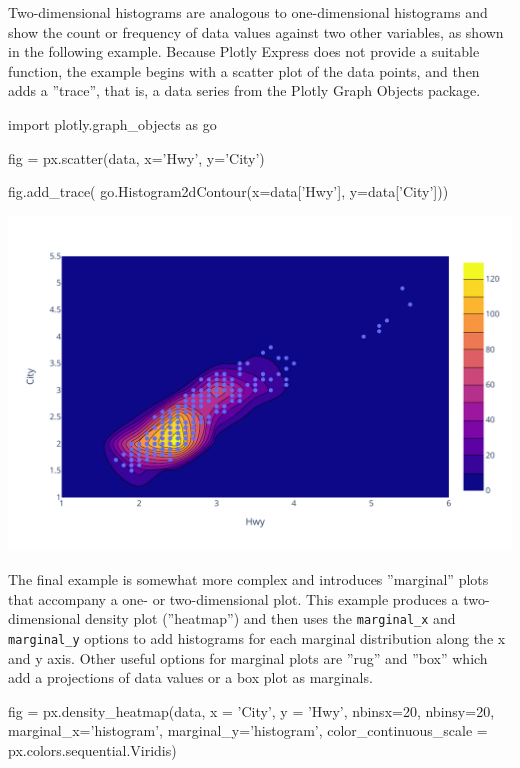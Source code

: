 Two-dimensional histograms  are analogous to one-dimensional histograms and show the count or frequency of data values against two other variables, as shown in the following example. Because Plotly Express does not provide a suitable function, the example begins with a scatter plot of the data points, and then adds a ''trace'', that is, a data series from the Plotly Graph Objects package. 

\begin{samepage}
\begin{pythoncode}
import plotly.graph_objects as go

fig = px.scatter(data, x='Hwy', y='City')

fig.add_trace(
  go.Histogram2dContour(x=data['Hwy'], y=data['City']))
\end{pythoncode}
\end{samepage}

\begin{center}
  \includegraphics[width=.8\textwidth]{px.fuel.density2d.pdf}
\end{center}

The final example is somewhat more complex and introduces ''marginal'' plots that accompany a one- or two-dimensional plot. This example produces a two-dimensional density plot (''heatmap'') and then uses the \texttt{marginal\_x} and \texttt{marginal\_y} options to add histograms for each marginal distribution along the x and y axis. Other useful options for marginal plots are ''rug'' and ''box'' which add a projections of data values or a box plot as marginals. 

\begin{samepage}
\begin{pythoncode}
fig = px.density_heatmap(data,
  x = 'City', y = 'Hwy',
  nbinsx=20, nbinsy=20,
  marginal_x='histogram', marginal_y='histogram',
  color_continuous_scale = px.colors.sequential.Viridis)
\end{pythoncode}
\end{samepage}

